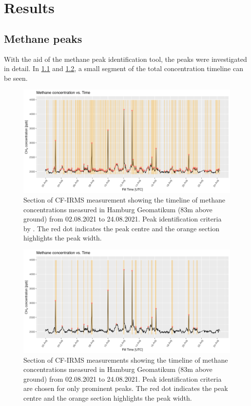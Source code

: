 \chapter{Results}
\label{chap:Results}

\section{Methane peaks}
With the aid of the methane peak identification tool, the peaks were investigated in detail. In \cref{TimelinePeaksPaper} and \cref{TimelineMediumPeaks}, a small segment of the total concentration timeline can be seen.
\begin{figure}[htbp]
 \centering
 \includegraphics[width=1\textwidth]{figures/Appendix/CH4_Timelines/4_CH4_Timeline0_Paper_Peaks.png}
 \caption[CH$_4$ Timeline with peak identification from literature]{Section of CF-IRMS measurement showing the timeline of methane concentrations measured in Hamburg Geomatikum (83m above ground) from 02.08.2021 to 24.08.2021. Peak identification criteria by \cite{Menoud.2021}. The red dot indicates the peak centre and the orange section highlights the peak width.}
 \label{TimelinePeaksPaper}
\end{figure}
\begin{figure}[htbp]
 \centering
 \includegraphics[width=1\textwidth]{figures/Appendix/CH4_Timelines/4_CH4_Timeline0_Medium_Peaks.png}
 \caption[CH$_4$ Timeline with strict peak identification]{Section of CF-IRMS measurements showing the timeline of methane concentrations measured in Hamburg Geomatikum (83m above ground) from 02.08.2021 to 24.08.2021. Peak identification criteria are chosen for only prominent peaks. The red dot indicates the peak centre and the orange section highlights the peak width.}
 \label{TimelineMediumPeaks}
\end{figure}
